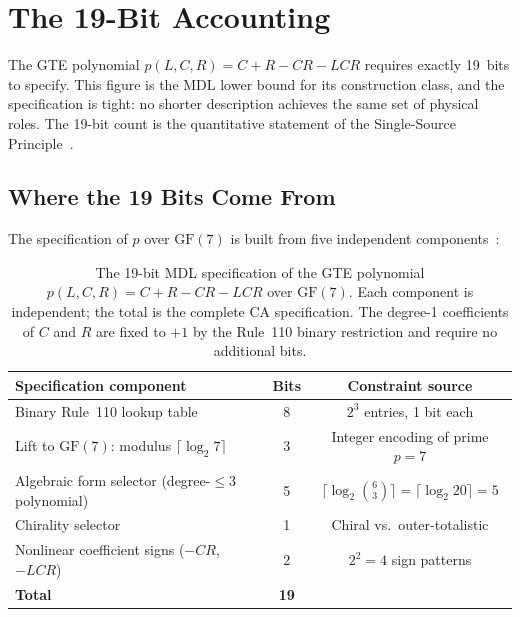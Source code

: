 \documentclass[11pt,openany]{book}
\theoremstyle{remark}
\newcommand{\poly}{p(L,C,R)}
\begin{document}
\section{The 19-Bit Accounting}
\label{sec:19bits}

The GTE polynomial $\poly = C+R-CR-LCR$ requires exactly 19~bits to specify. This
figure is the MDL lower bound for its construction class, and the specification is
tight: no shorter description achieves the same set of physical roles. The 19-bit
count is the quantitative statement of the Single-Source Principle~\cite{SpivackGTEPolynomialUFT}.

\subsection*{Where the 19 Bits Come From}

The specification of $p$ over $\mathrm{GF}(7)$ is built from five independent
components~\cite{SpivackGTEPolynomialUFT}:

\begin{table}[htbp]
\centering
\caption{The 19-bit MDL specification of the GTE polynomial $p(L,C,R) = C+R-CR-LCR$
over $\mathrm{GF}(7)$. Each component is independent; the total is the complete CA specification.
The degree-1 coefficients of $C$ and $R$ are fixed to $+1$ by the Rule~110 binary restriction
and require no additional bits.}
\label{tab:19bits}
\begin{tabular}{@{}P{6.5cm}cc@{}}
\toprule
\textbf{Specification component} & \textbf{Bits} & \textbf{Constraint source} \\
\midrule
Binary Rule~110 lookup table & 8 & $2^3$ entries, 1 bit each \\
Lift to $\mathrm{GF}(7)$: modulus $\lceil\log_2 7\rceil$ & 3 & Integer encoding of prime $p=7$ \\
Algebraic form selector (degree-$\leq 3$ polynomial) & 5 & $\lceil\log_2\binom{6}{3}\rceil = \lceil\log_2 20\rceil = 5$ \\
Chirality selector & 1 & Chiral vs.\ outer-totalistic \\
Nonlinear coefficient signs ($-CR$, $-LCR$) & 2 & $2^2 = 4$ sign patterns \\
\midrule
\textbf{Total} & \textbf{19} & \\
\bottomrule
\end{tabular}
\end{table}

\FloatBarrier
\end{document}
